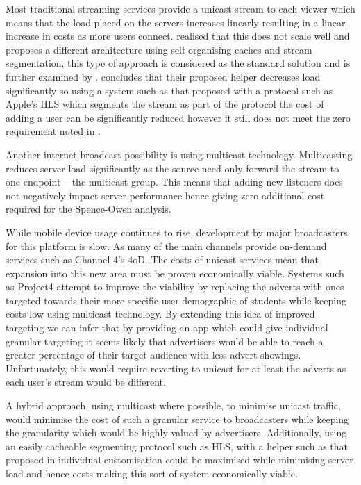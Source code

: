 Most traditional streaming services provide a unicast stream to each viewer which means that the load placed on the servers increases linearly resulting in a linear increase in costs as more users connect. \citet{cachedStream} realised that this does not scale well and proposes a different architecture using self organising caches and stream segmentation, this type of approach is considered as the standard solution and is further examined by \citet{segmentProxyCaching}. \citet{cachedStream} concludes that their proposed helper decreases load significantly so using a system such as that proposed with a protocol such as Apple's HLS\cite{HLS} which segments the stream as part of the protocol the cost of adding a user can be significantly reduced however it still does not meet the zero requirement noted in \citep{broadcastEconomics}.

Another internet broadcast possibility is using multicast technology\citep{multicast}. Multicasting reduces server load significantly as the source need only forward the stream to one endpoint -- the multicast group. This means that adding new listeners does not negatively impact server performance hence giving zero additional cost required for the Spence-Owen analysis\citep{broadcastEconomics}.

While mobile device usage continues to rise, development by major broadcasters for this platform is slow. As many of the main channels provide on-demand services such as Channel 4's 4oD. The costs of unicast services mean that expansion into this new area must be proven economically viable. Systems such as Project4 attempt to improve the viability by replacing the adverts with ones targeted towards their more specific user demographic of students while keeping costs low using multicast technology. By extending this idea of improved targeting we can infer that by providing an app which could give individual granular targeting it seems likely that advertisers would be able to reach a greater percentage of their target audience with less advert showings. Unfortunately, this would require reverting to unicast for at least the adverts as each user's stream would be different.

A hybrid approach, using multicast where possible, to minimise unicast traffic, would minimise the cost of such a granular service to broadcasters while keeping the granularity which would be highly valued by advertisers. Additionally, using an easily cacheable segmenting protocol such as HLS\citep{HLS}, with a helper such as that proposed in \citep{cachedStream} individual customisation could be maximised while minimising server load and hence costs making this sort of system economically viable.

